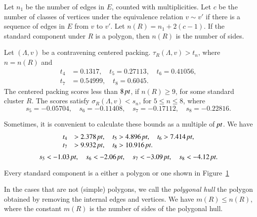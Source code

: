 Let $n_1$ be the number of edges in $E$, counted with multiplicities.
Let $c$ be the number of classes of vertices under the equivalence
relation $v\sim v'$ if there is a sequence of edges in $E$ from $v$ to
$v'$. Let $n(R)=n_1+2(c-1)$. If the standard component under $R$ is a
polygon, then $n(R)$ is the number of sides.

\begin{theorem}
    \label{thm:the-main-theorem}
    Let $(\Lambda,v)$ be a contravening centered packing.
$\tau_R(\Lambda,v) > t_n$, where $n=n(R)$ and
    $$
    \begin{array}{lll}
    t_4&=0.1317,\quad t_5=0.27113,\quad
    t_6=0.41056,\\
    t_7&=0.54999,\quad t_8=0.6045.
    \end{array}
    $$
The centered packing scores less than $8\,\hbox{\it pt}$, if $n(R)\ge 9$,
for some standard cluster $R$. The scores satisfy
$\sigma_R(\Lambda,v)<s_n$, for $5\le n\le 8$, where
    $$
    s_5=-0.05704,\quad s_6=-0.11408,\quad
    s_7=-0.17112,\quad s_8=-0.22816.
    $$
\end{theorem}

Sometimes, it is convenient to calculate these bounds as a multiple
of $\hbox{\it pt}$.  We have
    $$
    \begin{array}{lll}
    t_4&>2.378\,\hbox{\it pt},\quad t_5>4.896\,\hbox{\it pt},\quad
    t_6>7.414\,\hbox{\it pt},\\
    t_7&>9.932\,\hbox{\it pt},\quad
    t_8>10.916\,\hbox{\it pt}.
    \end{array}
    $$
    $$
    s_5 < -1.03\,\hbox{\it pt},\quad s_6<-2.06\,\hbox{\it pt},\quad
    s_7<-3.09\,\hbox{\it pt},\quad s_8<-4.12\,\hbox{\it pt}.
    $$




\begin{corollary}
    \label{cor:std-aggregate-list}
Every standard component is a either a polygon or one shown in
Figure~\ref{fig:std-aggregates}
\end{corollary}



\begin{figure}[htb]
  \centering
  \caption{}
  \label{fig:std-aggregates}
\end{figure}


In the cases that are not (simple) polygons, we call the {\it polygonal
hull\/} the polygon obtained by removing the internal edges and
vertices. We have $m(R)\le n(R)$, where the constant $m(R)$ is the
number of sides of the polygonal hull.

